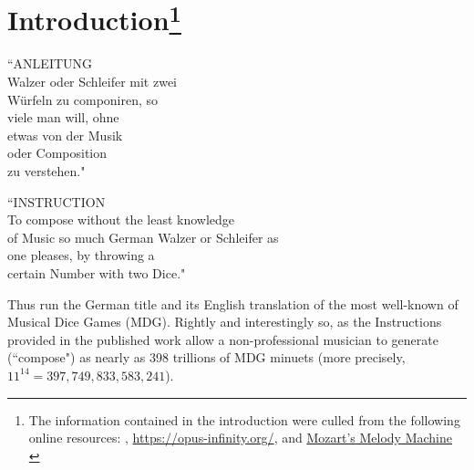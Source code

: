 \documentclass[letterpaper,x11names,svgnames,10pt]{article}
\begin{document}
{\section[Introduction]{Introduction\footnote{The information contained in the introduction were culled from the following online resources:
	\citet{wiki_mw2017},
	\url{https://opus-infinity.org/}, and 
	\hyperref{https://www.sciencenews.org/article/mozarts-melody-machine-0}{}{}{Mozart's Melody Machine} \citep*{peterson2001}
	}
}
	\begin{center}
	\begin{minipage}{0.4\textwidth}
	\begin{flushleft}
		\begin{center}
			``ANLEITUNG\\
			Walzer oder Schleifer mit zwei\\
			W\"{u}rfeln zu componiren, so\\
			viele man will, ohne\\
			etwas von der Musik\\
			oder Composition\\
			zu verstehen."\\
		\end{center}
	\end{flushleft}
	\end{minipage}
	\begin{minipage}{0.4\textwidth}
	\begin{flushright}
		\begin{center}
		``INSTRUCTION\\
		To compose without the least knowledge\\
		of Music so much German Walzer or Schleifer as\\
		one pleases, by throwing a\\
		certain Number with two Dice."
	\end{center}
	\end{flushright}
	\end{minipage}
	\end{center}

Thus run the German title and its English translation of the most well-known of Musical Dice Games (MDG).  Rightly and interestingly so, as the Instructions provided in the published work allow a non-professional musician to generate (``compose") as nearly as 398 trillions of MDG minuets (more precisely, $11^{14} = 397,749,833,583,241$).\\  

}
\end{document}

